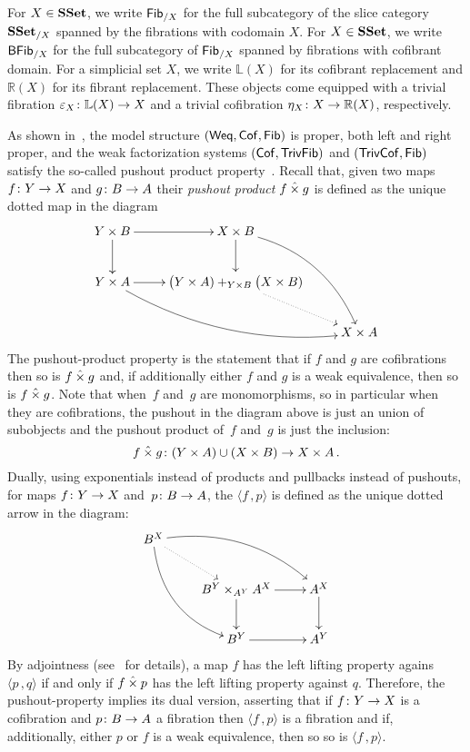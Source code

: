 \documentclass[reqno,10pt,a4paper,oneside,draft]{amsart}
\begin{document}
For $X \in \mathbf{SSet}$, we write $\mathsf{Fib}_{/X}$ for the full subcategory of the slice category $\mathbf{SSet}_{/X}$ spanned by the fibrations with codomain $X$. For $X \in \mathbf{SSet}$, we write $\mathsf{BFib}_{/X}$ for  the full subcategory of  $\mathsf{Fib}_{/X}$ spanned by fibrations with cofibrant domain. For a simplicial set $X$, we write $\mathbb{L}(X)$ for its cofibrant replacement and $\mathbb{R}(X)$ for its
fibrant replacement. These objects come equipped with a trivial fibration $\varepsilon_X \colon \mathbb{L}(X) \to X$ and a trivial cofibration $\eta_X \colon 
X \to \mathbb{R}(X)$, respectively.

\medskip

As shown in~\cite{henry2019qms}, the model structure $(\mathsf{Weq}, \mathsf{Cof}, \mathsf{Fib})$ is proper, \ie both left
and right proper, and the weak factorization systems $(\mathsf{Cof}, \mathsf{TrivFib})$ and $(\mathsf{TrivCof}, \mathsf{Fib})$
satisfy the so-called pushout product property~\cite{henry2018wms}. Recall that, given two maps $f \colon Y \rightarrow X$ and $g \colon B \rightarrow A$ their \emph{pushout product} $f \mathbin{\hat{\times}} g$ is defined as the unique dotted map in the diagram
\[
\xymatrix{
Y \times B \ar[r] \ar[d] &  X \times B \ar[d] \ar@/^1.5pc/[ddr] \\
Y \times A \ar[r]  \ar@/_1.5pc/[drr] & \displaystyle \big( Y \times A ) +_{Y \times B} \big( X \times B ) \ar@{.>}[dr]  \\
 & & X \times A }
 \]
The pushout-product property is  the statement that  if $f$ and $g$ are cofibrations then so is $f \mathbin{\hat{\times}} g$
and, if additionally either $f$ and $g$ is a weak equivalence, then so is $f \mathbin{\hat{\times}} g$.
Note that when~$f$ and~$g$ are monomorphisms, so in particular when they are cofibrations, the pushout in the diagram above is just an union of subobjects and the pushout product of~$f$ and~$g$ is just the inclusion:
\[  
f \mathbin{\hat{\times}} g \colon (Y \times A) \cup (X \times B) \rightarrow X \times A \, .
\]
Dually, using  exponentials instead of products and pullbacks instead of pushouts, for maps $f \colon Y \rightarrow X$ and~$p \colon B \rightarrow A$, the   $\langle f \, , p \rangle$ is defined as the unique dotted arrow in the diagram:
\[
\xymatrix{
 B^X \ar@{.>}[dr] \ar@/^1.5pc/[drr] \ar@/_1.5pc/[ddr] \\
& B^Y \times_{A^Y} A^X \ar[r] \ar[d] &  A^X \ar[d]  \\
& B^Y \ar[r] & A^Y  \\
 }
 \]
By adjointness (see~\cite{joyal-tierney-segal} for details), a map $f$ has the left lifting property agains $\langle p \, , q \rangle $ if and only if $f \mathbin{\hat{\times}} p$ has the left lifting property against $q$.
Therefore, the pushout-property  implies its dual version, asserting that  if $f \colon Y \to X$ is a cofibration and $p \colon B \to A$ a fibration then $\langle f \, , p \rangle$ is a fibration and if, additionally,  either $p$ or $f$ is a weak equivalence, then so so is $\langle f \, , p \rangle$.
\end{document}
